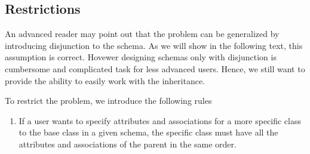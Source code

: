 \subsection*{Restrictions}

An advanced reader may point out that the problem can be generalized by introducing disjunction to the schema. As we will show in the following text, this assumption is correct. Hovewer designing schemas only with disjunction is cumbersome and complicated task for less advanced users. Hence, we still want to provide the ability to easily work with the inheritance.

To restrict the problem, we introduce the following rules
\begin{enumerate}
  \item If a user wants to specify attributes and associations for a more specific class to the base class in a given schema, the specific class must have all the attributes and associations of the parent in the same order.
\end{enumerate}


